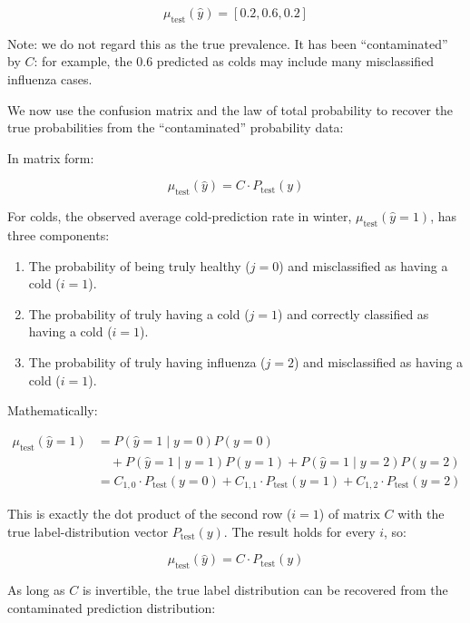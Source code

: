 \[
\mu_{\mathrm{test}}(\hat{y})=[0.2,0.6,0.2]
\]

Note: we do not regard this as the true prevalence. It has been ``contaminated'' by \(C\): for example, the \(0.6\) predicted as colds may include many misclassified influenza cases.

We now use the confusion matrix and the law of total probability to recover the true probabilities from the ``contaminated'' probability data:

In matrix form:

\[
\mu_{\mathrm{test}}(\hat{y})=C\cdot P_{\mathrm{test}}(y)
\]

For colds, the observed average cold-prediction rate in winter, \(\mu_{\mathrm{test}}(\hat{y}=1)\), has three components:

\begin{enumerate}
\def\labelenumi{\arabic{enumi}.}
\tightlist
\item
  The probability of being truly healthy (\(j=0\)) and misclassified as having a cold (\(i=1\)).
\item
  The probability of truly having a cold (\(j=1\)) and correctly classified as having a cold (\(i=1\)).
\item
  The probability of truly having influenza (\(j=2\)) and misclassified as having a cold (\(i=1\)).
\end{enumerate}

Mathematically:

\[
\begin{aligned}
\mu_{\mathrm{test}}(\hat{y}=1)
&=P(\hat{y}=1\mid y=0)P(y=0)\\
&\quad+P(\hat{y}=1\mid y=1)P(y=1)
+P(\hat{y}=1\mid y=2)P(y=2)\\
&=C_{1,0}\cdot P_{\mathrm{test}}(y=0)
+C_{1,1}\cdot P_{\mathrm{test}}(y=1)
+C_{1,2}\cdot P_{\mathrm{test}}(y=2)
\end{aligned}
\]

This is exactly the dot product of the second row (\(i=1\)) of matrix \(C\) with the true label-distribution vector \(P_{\mathrm{test}}(y)\). The result holds for every \(i\), so:

\[
\mu_{\mathrm{test}}(\hat{y})=C\cdot P_{\mathrm{test}}(y)
\]

As long as \(C\) is invertible, the true label distribution can be recovered from the contaminated prediction distribution:

